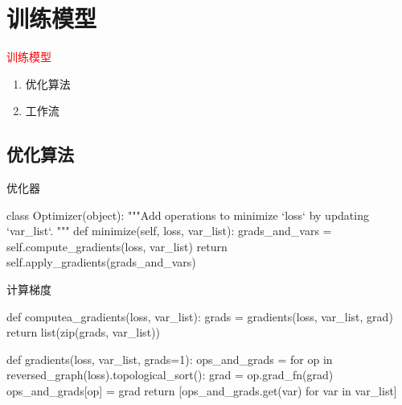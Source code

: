 \section{训练模型}
\label{sec:train-model}

\begin{frame}
  \begin{center}
    \Huge{\textcolor{red}{训练模型}}
  \end{center}

  \begin{enumerate}
    \item \alert{优化算法}
    \item \alert{工作流}
  \end{enumerate}    
\end{frame}

\subsection{优化算法}

\begin{frame}[fragile]{优化器}
  \begin{python} 
class Optimizer(object):
  """Add operations to minimize `loss` by updating `var\_list`.
  """
  def minimize(self, loss, var_list):
    grads_and_vars = self.compute_gradients(loss, var_list)
    return self.apply_gradients(grads_and_vars)
  \end{python}
\end{frame}

\begin{frame}[fragile]{计算梯度}
  \begin{python} 
def computea_gradients(loss, var_list):
  grads = gradients(loss, var_list, grad)
  return list(zip(grads, var_list))

def gradients(loss, var_list, grads=1):
  ops_and_grads = {}
  for op in reversed_graph(loss).topological_sort():
    grad = op.grad_fn(grad)
    ops_and_grads[op] = grad
  return [ops_and_grads.get(var) for var in var_list]
  \end{python}
\end{frame}


